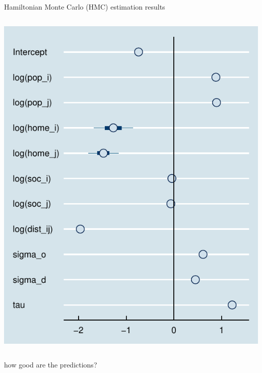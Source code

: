 \documentclass{beamer}
\begin{document}
\begin{frame}{Hamiltonian Monte Carlo (HMC) estimation results}
\begin{columns}
\begin{column}{0.5\textwidth}
			\begin{center}
				\includegraphics[width=\textwidth]{../fig/forestplot}      
			\end{center}
		\end{column}
	\end{columns}
\end{frame}

\begin{frame}{how good are the predictions?}

\end{frame}
\end{document}
